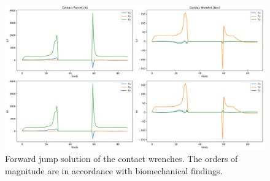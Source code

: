 \begin{figure}[h!]
\centering	
\includegraphics[width=1\textwidth]{fig/jumpForward/ContactWrenches}
\caption[Forward jump solution of the contact wrenches]{Forward jump solution of the contact wrenches. The orders of magnitude are in accordance with biomechanical findings.}
\label{fig:jumpForward_ContactWrenches}
\end{figure} 


